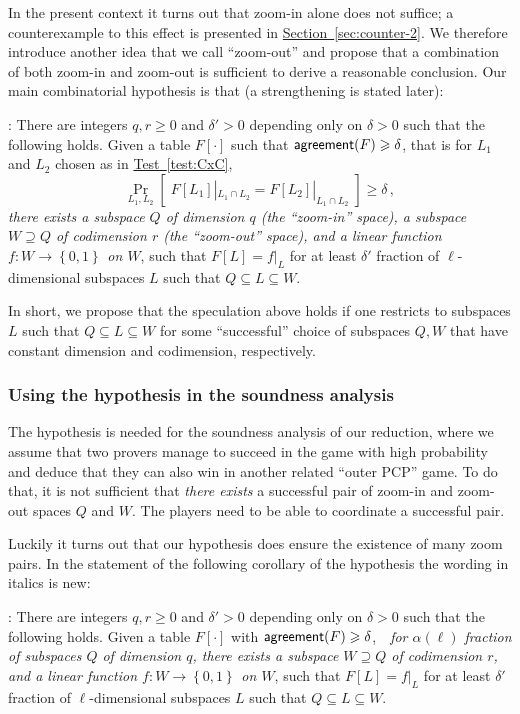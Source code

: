 \documentclass[11pt]{article}
\numberwithin{equation}{section}
\theoremstyle{definition}
\theoremstyle{plain}
\newcommand{\expref}[2]{\hyperref[#2]{#1~\ref{#2}}}
\newcommand\set[1]{{\left\{ #1 \right\}}}
\newcommand\Prob[2]{{\Pr_{#1}\left[ {#2} \right]}}
\newcommand\power[1]{\set{0,1}^{#1}}
\renewcommand\geq{\geqslant}
\renewcommand\ge{\geqslant}
\def\agr{{\sf agreement}}
\begin{document}
In the present context it turns out that zoom-in alone does
not suffice; a counterexample to this effect is presented in
\expref{Section}{sec:counter-2}. We therefore introduce another idea that we call
``zoom-out'' and propose that a combination of both zoom-in and zoom-out is
sufficient to derive a reasonable conclusion. Our main combinatorial hypothesis
is that (a strengthening is stated later):

\medskip
{}: There are
integers $q, r \geq 0$ and %
$\delta' > 0$ depending only on
$\delta > 0$ such that the following holds. Given a table $F[\cdot]$
such that $\agr(F)\ge \delta$, that is  for $L_1$ and $L_2$ chosen as in
\expref{Test}{test:CxC},
\[ \Prob{L_1,L_2}{\;F[L_1]|_{L_1\cap L_2} = F[L_2]|_{L_1\cap L_2}\;}\ge\delta \,,
\]
{\it there exists a subspace $Q$ of dimension $q$ (the ``zoom-in'' space),
a subspace $W \supseteq Q$ of codimension %
$r$ (the ``zoom-out'' space), and a linear function $f:W \to \power{}$ on $W$}, such that $F[L] = f|_L$ for at least  $\delta'$ fraction of $\ell$-dimensional
subspaces $L$ such that $Q \subseteq L \subseteq W$.

\medskip In short, we propose that the speculation above holds if one restricts to subspaces $L$ such that $Q \subseteq L \subseteq W$ for some ``successful'' choice of
subspaces $Q, W$ that have constant dimension and codimension, %
respectively.



\subsubsection{Using the hypothesis in the soundness analysis}
The hypothesis is needed for the soundness
analysis of our reduction, where we assume that two provers manage to
succeed in the game with high probability and deduce that they can
also win in another related ``outer PCP'' game. To do that, it is not
sufficient that {\em there exists} a successful pair of zoom-in and
zoom-out spaces $Q$ and $W$. The players need to be able to coordinate a successful pair.

Luckily it turns out that our hypothesis does ensure the existence of
many zoom pairs. In the statement of the following corollary of the
hypothesis the wording in italics is new:


\medskip
{}:
There are integers $q, r \geq 0$ and %
$\delta' > 0$ depending
only on $\delta > 0$ such that the following holds. Given a table
$F[\cdot]$ with $\agr(F)\ge\delta$,\ \  {\it for $\alpha(\ell)$ fraction
  of subspaces $Q$ of dimension $q$, there exists a subspace
  $W \supseteq Q$ of codimension %
  $r$, and a linear function
  $f:W \to \power{}$ on $W$}, such that $F[L] = f|_L$ for at least
$\delta'$ fraction of $\ell$-dimensional subspaces $L$ such that
$Q \subseteq L \subseteq W$.
\end{document}
